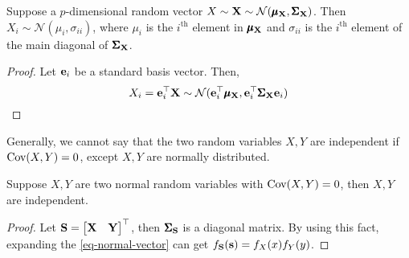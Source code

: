         \begin{Thm}
            Suppose a $p$-dimensional random vector $X\sim \mathbf{X}\sim\mathcal{N}(\pmb{\mu}_{\mathbf{X}}, \pmb{\Sigma}_{\mathbf{X}})$. Then $X_i \sim \mathcal{N}(\mu_i, \sigma_{ii})$, where $\mu_i$ is the $i^{\text{th}}$ element in $\pmb{\mu}_{\mathbf{X}}$ and $\sigma_{ii}$ is the $i^{\text{th}}$ element of the main diagonal of $\pmb{\Sigma}_{\mathbf{X}}$.
            \begin{proof}
                Let $\mathbf{e}_i$ be a standard basis vector. Then,
                \begin{equation}
                    X_i = \mathbf{e}_i^{\top}\mathbf{X} \sim \mathcal{N}(\mathbf{e}_i^{\top} \pmb{\mu}_{\mathbf{X}}, \mathbf{e}_i^{\top} \pmb{\Sigma}_{\mathbf{X}}\mathbf{e}_i)
                \end{equation}
            \end{proof}
        \end{Thm}
        Generally, we cannot say that the two random variables $X, Y$ are independent if $\text{Cov}(X, Y) = 0$, except $X, Y$ are normally distributed.
        \begin{Thm}
            Suppose $X, Y$ are two normal random variables with $\text{Cov}(X, Y) = 0$, then $X, Y$ are independent.

            \begin{proof}
                Let $\mathbf{S} = \begin{bmatrix}
                    \mathbf{X} & \mathbf{Y}
                \end{bmatrix}^\top$, then $\pmb{\Sigma}_{\mathbf{S}}$ is a diagonal matrix. By using this fact, expanding the \cref{eq-normal-vector} can get $\pdfn{S} =  f_{X}(x)f_{Y}(y)$.
            \end{proof}
        \end{Thm}


